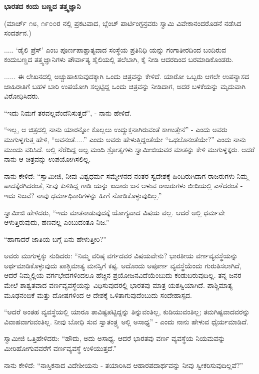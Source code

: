 \begin{center}
\textbf{ಭಾರತದ ಕಂದು ಬಣ್ಣದ ತತ್ತ್ವಜ್ಞಾನಿ}
\end{center}

(ಮಾರ್ಚ್ ೧೮, ೧೯೦೦ರ  ನಲ್ಲಿ ಪ್ರಕಟವಾದ, ಬ್ಲೆಂಚ್ ಪಾರ್ಟಿಂಗ್ಟನ್ರವರು ಸ್ವಾಮಿ ವಿವೇಕಾನಂದರೊಡನೆ ನಡೆಸಿದ ಸಂದರ್ಶನ.)

..... ‘ಡೈಲಿ ಪ್ರೆಸ್’ ಎಂಬ ಪೂರ್ಣಪಾಶ್ಚಾತ್ಯವಾದ ಸಂಸ್ಥೆಯ ಪ್ರತಿನಿಧಿ ಯನ್ನು ಗಂಗಾತೀರದಿಂದ ಬಂದಿರುವ ಕಂದುಬಣ್ಣದ ತತ್ತ್ವಜ್ಞಾನಿಗಳು ಪೌರ್ವಾತ್ಯ ಶೈಲಿಯಲ್ಲಿ ತಲೆಬಾಗಿ, ಕೈ ನೀಡಿ ಆದರದಿಂದ ಬರಮಾಡಿಕೊಂಡರು.

...... ಈ ಲೇಖನದಲ್ಲಿ ಅಚ್ಚುಹಾಕಿಸುವುದಕ್ಕಾಗಿ ಒಂದು ಚಿತ್ರವನ್ನು ಕೇಳಿದೆ. ಯಾರೋ ಒಬ್ಬರು ಆಗಲೇ ಉಪನ್ಯಾಸದ ಜಾಹಿರಾತಿಗೆ ಬಹಳ ಬಾರಿ ಉಪಯೋಗಿ ಸಲ್ಪಟ್ಟಿದ್ದ ಒಂದು ಚಿತ್ರವನ್ನು ನೀಡಿದಾಗ, ಅದರ ಬಳಕೆಯನ್ನು ಮೃದುವಾಗಿ ವಿರೋಧಿಸಿದರು.

“ಇದು ನಿಮಗೆ ತರವಲ್ಲವೆಂದೆನಿಸುತ್ತದೆ”, - ನಾನು ಹೇಳಿದೆ.

“ಇಲ್ಲ, ಆ ಚಿತ್ರದಲ್ಲಿ ನಾನು ಯಾರನ್ನೋ ಕೊಲ್ಲಲು ಉದ್ಯುಕ್ತನಾಗಿರುವಂತೆ ಕಾಣುತ್ತೇನೆ” - ಎಂದು ಅವರು ಮುಗುಳ್ನಗುತ್ತ ಹೇಳಿ, “ಅವನಂತೆ.....” ಎಂದು ಅವರು ಹೇಳುತ್ತಿದ್ದಂತೆಯೇ “ಒಥಲೊನಂತೆಯೇ?” ಎಂದು ನಾನು ಮುಂದು ವರಿಸಿದೆ. ಅಲ್ಲಿ ನೆರೆದಿದ್ದ ಅಲ್ಪ ಮಂದಿ ಶ್ರೋತೃಗಳು ಸ್ವಾಮೀಜಿಯವರ ಮಾತನ್ನು ಕೇಳಿ ಮುಗುಳ್ನಕ್ಕರು. ಆದರೆ ನಾನು ಆ ಚಿತ್ರವನ್ನು ಉಪಯೋಗಿಸಲಿಲ್ಲ.

ನಾನು ಕೇಳಿದೆ: “ಸ್ವಾಮೀಜಿ, ನೀವು ವಿಶ್ವಧರ್ಮ ಸಮ್ಮೇಳನದ ನಂತರ ಸ್ವದೇಶಕ್ಕೆ ಹಿಂದಿರುಗಿದಾಗ ರಾಜರುಗಳು ನಿಮ್ಮ ಪಾದಕ್ಕೆರಗಿದರಂತೆ, ನೀವು ಕುಳಿತಿದ್ದ ಗಾಡಿ ಯನ್ನು ಐದಾರು ಜನ ಆಳುವ ರಾಜರುಗಳು ಬೀದಿಯಲ್ಲಿ ಎಳೆದರಂತೆ - ಇದು ನಿಜವೆ? ನಾವು ಧರ್ಮಾಧಿಕಾರಿಗಳನ್ನು ಹೀಗೆ ನೋಡಿಕೊಳ್ಳುವುದಿಲ್ಲ.”

ಸ್ವಾಮೀಜಿ ಹೇಳಿದರು, “ಇದು ಮಾತನಾಡುವುದಕ್ಕೆ ಯೋಗ್ಯವಾದ ವಿಷಯ ವಲ್ಲ. ಆದರೆ ಅಲ್ಲಿ ಧರ್ಮವೇ ಆಳುತ್ತಿರುವುದು, ಹಣವಲ್ಲ ಎಂಬುದಂತೂ ನಿಜ.”

“ಹಾಗಾದರೆ ಜಾತಿಯ ಬಗ್ಗೆ ಏನು ಹೇಳುತ್ತೀರಿ?”

ಅವರು ಮುಗುಳ್ನಕ್ಕು ನುಡಿದರು: “ನಿಮ್ಮ ವರಿಷ್ಠ ವರ್ಗದವರ ವಿಷಯವೇನು? ಭಾರತೀಯ ವರ್ಣವ್ಯವಸ್ಥೆಯನ್ನು ಅರ್ಥಮಾಡಿಕೊಳ್ಳುವುದು ಪಾಶ್ಚಿಮಾತ್ಯ ಮನಸ್ಸಿಗೆ ಕಷ್ಟ. ಅದೊಂದು ಅಪೂರ್ಣ ವ್ಯವಸ್ಥೆಯೆಂದು ಗುರುತಿಸಲಾಗಿದೆ, ಆದರೆ ನಿಮ್ಮಲ್ಲಿಯ ವರ್ಗಭೇದಗಳಿಂದಲೂ ಹೆಚ್ಚಿನ ಪ್ರಯೋಜನವಿದೆಯೆಂಬುದು ಕಂಡುಬರುವುದಿಲ್ಲ. ತನ್ನ ಜನರ ಮೇಲೆ ಶಾಶ್ವತವಾದ ವರ್ಣವ್ಯವಸ್ಥೆಯನ್ನು ವಿಧಿಸುವುದರಲ್ಲಿ ಭಾರತವು ಮಾತ್ರ ಯಶಸ್ವಿಯಾಗಿದೆ. ಪಾಶ್ಚಿಮಾತ್ಯ ಮೂಢನಂಬಿಕೆ ಮತ್ತು ದೋಷಗಳಿಂದ ಆ ದೇಶಕ್ಕೆ ಒಳಿತಾಗುವುದೆಂಬುದು ಸಂದೇಹಾಸ್ಪದ.

“ಆದರೆ ಅಂತಹ ವ್ಯವಸ್ಥೆಯಲ್ಲಿ ಯಾರೂ ತಾವಿಷ್ಟಪಟ್ಟಿದ್ದನ್ನು ತಿನ್ನುವಂತಿಲ್ಲ, ಕುಡಿಯುವಂತಿಲ್ಲ; ತಮಗಿಷ್ಟವಾದವರನ್ನು ವಿವಾಹವಾಗುವಂತಿಲ್ಲ. ನೀವು ಬೋಧಿ ಸುವ ಸ್ವಾತಂತ್ರ್ಯ ಅಲ್ಲಿ ಅಸಾಧ್ಯ” - ಎಂದು ನಾನು ಹೇಳುವ ಧೈರ್ಯಮಾಡಿದೆ.

ಸ್ವಾಮೀಜಿ ಒತ್ತಿಹೇಳಿದರು: “ಹೌದು, ಅದು ಅಸಾಧ್ಯ. ಆದರೆ ಭಾರತವು ವರ್ಣ ವ್ಯವಸ್ಥೆಯ ನಿಯಮವನ್ನು ಮೀರಿಹೋಗುವವರೆಗೆ ವರ್ಣವ್ಯವಸ್ಥೆ ಉಳಿಯುತ್ತದೆ.”

ನಾನು ಕೇಳಿದೆ: “ನಾಸ್ತಿಕನಾದ ವಿದೇಶೀಯನು - ತಯಾರಿಸಿದ ಆಹಾರಪದಾರ್ಥವನ್ನು ನೀವು ಸ್ವೀಕರಿಸುವುದಿಲ್ಲವೆ?”

